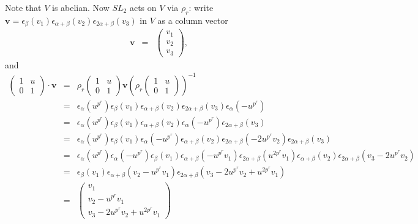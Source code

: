 Note that $V$ is abelian. Now $SL_2$ acts on $V$ via $\rho_r$: write $\mathbf{v} = \epsilon_ \beta (v_1)\epsilon_{\alpha+\beta}(v_2) \epsilon_{2\alpha+\beta}(v_3)$ in $V$ as a column vector
\begin{eqnarray*}
\mathbf{v} &=& \left(\begin{matrix} v_1 \\ v_2 \\ v_3 \end{matrix}\right),
\end{eqnarray*}
and
\begin{eqnarray*}
\left(\begin{matrix} 1 & u \\ 0 & 1\end{matrix}\right) \cdot \mathbf{v} 
&=& 
\rho_r\left(\begin{matrix} 1 & u \\ 0 & 1\end{matrix}\right) \mathbf{v}\left( \rho_r\left(\begin{matrix} 1 & u \\ 0 & 1\end{matrix}\right)\right)^{-1} \\
&=&
\epsilon_ \alpha (u^{p^r}) \epsilon_ \beta (v_1)\epsilon_{\alpha+\beta}(v_2) \epsilon_{2\alpha+\beta}(v_3) \epsilon_ \alpha (-u^{p^r}) \\
&=&
\epsilon_ \alpha (u^{p^r}) \epsilon_ \beta (v_1) \epsilon_{\alpha+\beta}(v_2) \epsilon_ \alpha (-u^{p^r}) \epsilon_{2\alpha+\beta}(v_3) \\
&=&
\epsilon_ \alpha (u^{p^r}) \epsilon_ \beta (v_1)  \epsilon_ \alpha (-u^{p^r}) \epsilon_{\alpha+\beta}(v_2) \epsilon_{2\alpha+\beta}(-2u^{p^r}v_2)\epsilon_{2\alpha+\beta}(v_3)\\
&=&
\epsilon_ \alpha (u^{p^r}) \epsilon_ \alpha (-u^{p^r})  \epsilon_ \beta (v_1) \epsilon_{\alpha+\beta}(-u^{p^r}v_1) \epsilon_{2\alpha+\beta}(u^{2p^r}v_1) \epsilon_{\alpha+\beta}(v_2) \epsilon_{2\alpha+\beta}(v_3-2u^{p^r}v_2)\\
&=&
\epsilon_ \beta (v_1)  \epsilon_{\alpha+\beta}(v_2-u^{p^r}v_1) \epsilon_{2\alpha+\beta}(v_3-2u^{p^r}v_2 + u^{2p^r}v_1)\\
&=& \left(\begin{matrix} v_1 \\ v_2-u^{p^r}v_1 \\ v_3-2u^{p^r}v_2 + u^{2p^r}v_1 \end{matrix}\right) \\

\end{eqnarray*}
